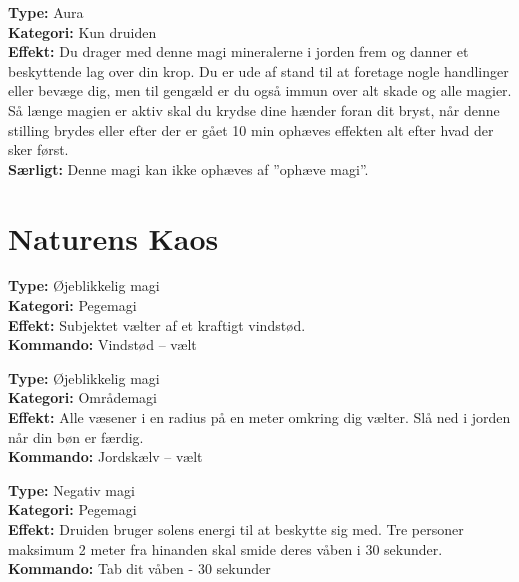 \begin{nbesk*}[Stenform]
\textbf{Type:} Aura \\
\textbf{Kategori:} Kun druiden \\
\textbf{Effekt:} Du drager med denne magi mineralerne i jorden frem og danner et beskyttende lag over din krop. Du er ude af stand til at foretage nogle handlinger eller bevæge dig, men til gengæld er du også immun over alt skade og alle magier.\\
Så længe magien er aktiv skal du krydse dine hænder foran dit bryst, når denne stilling brydes eller efter der er gået 10 min ophæves effekten alt efter hvad der sker først.\\
\textbf{Særligt:} Denne magi kan ikke ophæves af ”ophæve magi”.
\end{nbesk*}

\section{Naturens Kaos}
\begin{nkaos*}[Vindstød]
\textbf{Type:} Øjeblikkelig magi\\ 
\textbf{Kategori:} Pegemagi\\
\textbf{Effekt:} Subjektet vælter af et kraftigt vindstød.\\
\textbf{Kommando:} Vindstød – vælt
\end{nkaos*}

\begin{nkaos*}[Jordskælv]
\textbf{Type:} Øjeblikkelig magi\\ 
\textbf{Kategori:} Områdemagi\\
\textbf{Effekt:} Alle væsener i en radius på en meter omkring dig vælter. Slå ned i jorden når din bøn er færdig.\\
\textbf{Kommando:} Jordskælv – vælt

\end{nkaos*}

\begin{nkaos*}
\textbf{Type:} Negativ magi\\
\textbf{Kategori:} Pegemagi\\
\textbf{Effekt:} Druiden bruger solens energi til at beskytte sig med. Tre personer maksimum 2 meter fra hinanden skal smide deres våben i 30 sekunder.\\
\textbf{Kommando:} Tab dit våben - 30 sekunder

\end{nkaos*}


